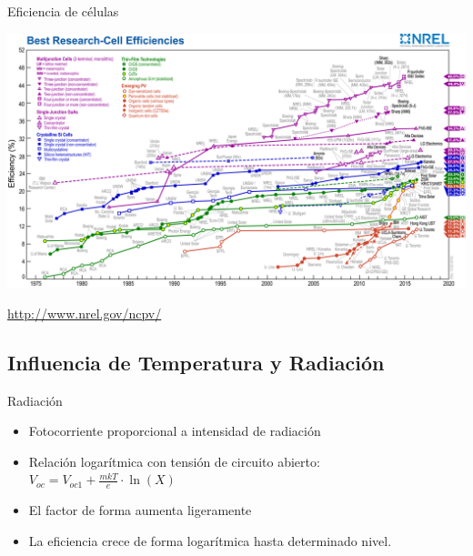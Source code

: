 \documentclass[xcolor={usenames,svgnames,dvipsnames}]{beamer}
\begin{document}
\begin{frame}[plain,label={sec:orge380b90}]{Eficiencia de células}
\begin{center}
\includegraphics[width=1.2\textwidth]{../figs/efficiency_chart_nrel.jpg}
\end{center}

\url{http://www.nrel.gov/ncpv/}
\end{frame}

\subsection{Influencia de Temperatura y Radiación}
\label{sec:orgda904f4}

\begin{frame}[label={sec:org615bc99}]{Radiación}
\begin{itemize}
\item \alert{Fotocorriente proporcional a intensidad de radiación}

\item Relación logarítmica con tensión de circuito abierto:
\(V_{oc}=V_{oc1}+\frac{mkT}{e}\cdot\ln(X)\)

\item El factor de forma aumenta ligeramente

\item La eficiencia crece de forma logarítmica hasta determinado nivel.
\end{itemize}
\end{frame}
\end{document}
